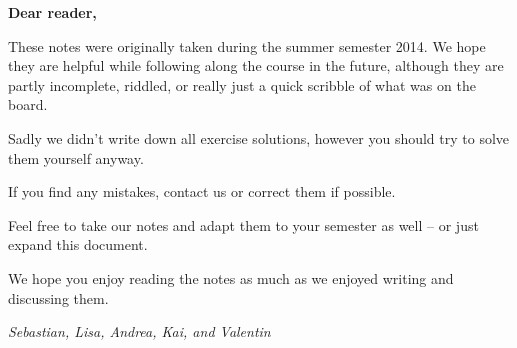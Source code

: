 \documentclass[../main/Notes.tex]{subfiles}
\begin{document}
\vspace*{\fill}

\textbf{\large Dear reader,}

\smallskip

These notes were originally taken during the summer semester 2014. We hope they are helpful while following along the course in the future, although they are partly incomplete, riddled, or really just a quick scribble of what was on the board.

Sadly we didn't write down all exercise solutions, however you should try to solve them yourself anyway.

If you find any mistakes, contact us or correct them if possible.

Feel free to take our notes and adapt them to your semester as well -- or just expand this document.

\smallskip

We hope you enjoy reading the notes as much as we enjoyed writing and discussing them.

\bigskip

\textsl{Sebastian, Lisa, Andrea, Kai, and Valentin}
\end{document}
